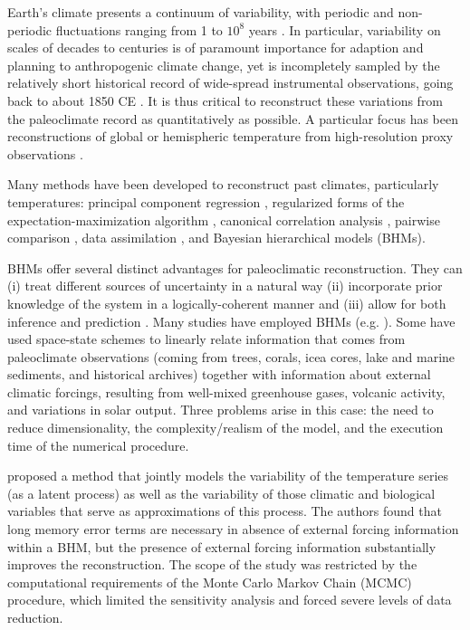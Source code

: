 \documentclass[12pt]{amsart}
\theoremstyle{plain}
\theoremstyle{definition}
\theoremstyle{remark}
\begin{document}
Earth's climate presents a continuum of variability, with periodic and non-periodic fluctuations ranging from 1 to $10^8$ years \citep{pelletier_power_1998}. In particular, variability on scales of decades to centuries is of paramount importance for adaption and planning to anthropogenic climate change, yet is incompletely sampled by the relatively short historical record of wide-spread instrumental observations, going back to about 1850 CE \citep{AR5_chap5}. It is thus critical to reconstruct these variations from the paleoclimate record as quantitatively as possible.  A particular focus has been reconstructions of global or hemispheric temperature from high-resolution proxy observations \citep{Jones_Holocene09}.

Many methods have been developed to reconstruct past climates, particularly temperatures:  principal component regression
\citep{MBH98,luterbacher2004european,Wahl2012}, regularized forms of the expectation-maximization algorithm \citep{Schneider2001,bradley2005proxy,mann2005testing,mann2007robust,rutherford2003climate,steig2009,JEG10a,Guillot_AOAS2015}, canonical
correlation analysis \citep{smerdon2010pseudoproxy,Wang_CP2014,Evans_grl2014}, pairwise comparison
\citep{Hanhijarvi2013,Gergis2016}, data assimilation \citep{Lee_CD08,Hakim2016}, and Bayesian hierarchical models (BHMs). 

BHMs offer several distinct advantages for paleoclimatic reconstruction. They can (i) treat different sources of uncertainty in a natural way (ii) incorporate prior knowledge of the system in a logically-coherent manner \citep{Jaynes04} and (iii) allow for both inference and prediction \citep{Tingley_QSR2012}. 
Many studies have employed BHMs (e.g. \cite{boli1, tingley2013_Ext,Barboza2014}). Some have used space-state
schemes to linearly relate information that comes from paleoclimate observations (coming from trees, corals, icea cores, lake and marine sediments, and historical archives) together with information about external climatic forcings, resulting from 
well-mixed greenhouse gases, volcanic activity, and variations in solar output.   Three problems arise in this
case: the need to reduce dimensionality, the complexity/realism of the model, and the execution time of the numerical procedure. 

\citet{Barboza2014} proposed a method that jointly models the variability of the
temperature series (as a latent process) as well as the variability of those
climatic and biological variables that serve as approximations of this process.
The authors found that long memory error terms are necessary in absence of
external forcing information within a BHM, but the
presence of external forcing information substantially improves the reconstruction. The scope of the study was restricted by the computational requirements of the Monte Carlo Markov Chain (MCMC) procedure, which limited the sensitivity analysis and forced severe levels of data reduction. 
\end{document}
